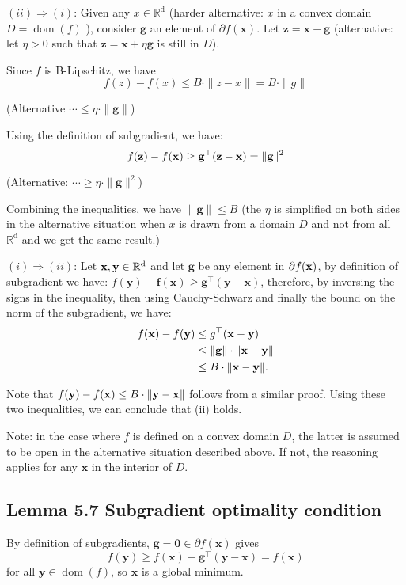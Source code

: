 $(ii) \Longrightarrow (i)$: Given any $x \in \mathbb{R}^{\mathrm{d}}$ (harder alternative: $x$ in a convex domain $D=\operatorname{dom}(f)$ ), consider $\mathbf{g}$ an element of $\partial f(\mathbf{x})$. Let $\mathbf{z}=\mathbf{x}+\mathbf{g}$ (alternative: let $\eta>0$ such that $\mathbf{z}=\mathbf{x}+\eta \boldsymbol{g}$ is still in $D$).

Since $f$ is B-Lipschitz, we have
$$
f(z)-f(x) \leq B \cdot\|z-x\|=B \cdot\|g\|
$$

(Alternative $\cdots \leq \eta \cdot\|\mathbf{g}\|$)

Using the definition of subgradient, we have:
$$
f(\boldsymbol{\mathbf{z}})-f(\boldsymbol{\mathbf{x}}) \geq \mathbf{g}^{\top}(\mathbf{\boldsymbol{\mathbf{z}}}-\mathbf{\boldsymbol{\mathbf{x}}})=\|\mathbf{g}\|^{2}
$$

(Alternative: $\cdots \geq \eta \cdot\|\mathbf{g}\|^{2}$)

Combining the inequalities, we have $\|\mathbf{g}\| \leq B$ (the $\eta$ is simplified on both sides in the alternative situation when $x$ is drawn from a domain $D$ and not from all $\mathbb{R}^{\mathrm{d}}$ and we get the same result.)

$(i) \Longrightarrow (ii)$:
Let $\boldsymbol{\mathbf{x}}, \boldsymbol{\mathbf{y}} \in \mathbb{R}^{\mathrm{d}}$ and let $\mathbf{g}$ be any element in $\partial f(\boldsymbol{\mathbf{x}})$, by definition of subgradient we have: $f(\mathbf{y})-\mathbf{f}(\mathbf{x}) \geq \mathbf{g}^{\top}(\mathbf{y}-\mathbf{x})$, therefore, by inversing the signs in the inequality, then using Cauchy-Schwarz and finally the bound on the norm of the subgradient, we have:
$$
\begin{aligned}
f(\boldsymbol{\mathbf{x}})-f(\boldsymbol{\mathbf{y}}) & \leq g^{\top}(\boldsymbol{\mathbf{x}}-\boldsymbol{\mathbf{y}}) \\
& \leq\|\mathbf{g}\| \cdot\|\boldsymbol{\mathbf{x}}-\boldsymbol{\mathbf{y}}\| \\
& \leq B \cdot\|\boldsymbol{\mathbf{x}}-\boldsymbol{\mathbf{y}}\| .
\end{aligned}
$$

Note that $f(\boldsymbol{\mathbf{y}})-f(\boldsymbol{\mathbf{x}}) \leq B \cdot\|\boldsymbol{\mathbf{y}}-\boldsymbol{\mathbf{x}}\|$ follows from a similar proof. Using these two inequalities, we can conclude that (ii) holds.

Note: in the case where $f$ is defined on a convex domain $D$, the latter is assumed to be open in the alternative situation described above. If not, the reasoning applies for any $\mathbf{x}$ in the interior of $D$.





\subsection*{Lemma 5.7 Subgradient optimality condition}
By definition of subgradients, $\mathbf{g}=\mathbf{0} \in \partial f(\mathbf{x})$ gives
$$
f(\mathbf{y}) \geq f(\mathbf{x})+\mathbf{g}^{\top}(\mathbf{y}-\mathbf{x})=f(\mathbf{x})
$$
for all $\mathbf{y} \in \operatorname{dom}(f)$, so $\mathbf{x}$ is a global minimum.



